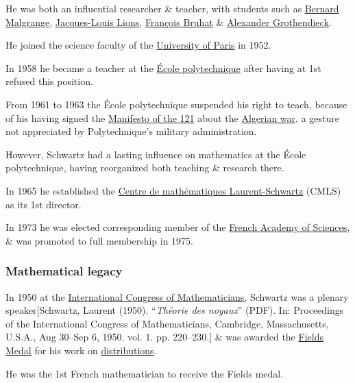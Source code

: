 \documentclass{article}
\begin{document}
He was both an influential researcher \& teacher, with students such as \href{https://en.wikipedia.org/wiki/Bernard_Malgrange}{Bernard Malgrange}, \href{https://en.wikipedia.org/wiki/Jacques-Louis_Lions}{Jacques-Louis Lions}, \href{https://en.wikipedia.org/wiki/Fran%C3%A7ois_Bruhat}{François Bruhat} \& \href{https://en.wikipedia.org/wiki/Alexander_Grothendieck}{Alexander Grothendieck}.

He joined the science faculty of the \href{https://en.wikipedia.org/wiki/University_of_Paris}{University of Paris} in 1952.

In 1958 he became a teacher at the \href{https://en.wikipedia.org/wiki/%C3%89cole_polytechnique}{École polytechnique} after having at 1st refused this position.

From 1961 to 1963 the École polytechnique suspended his right to teach, because of his having signed the \href{https://en.wikipedia.org/wiki/Manifesto_of_the_121}{Manifesto of the 121} about the \href{https://en.wikipedia.org/wiki/Algerian_war}{Algerian war}, a gesture not appreciated by Polytechnique's military administration.

However, Schwartz had a lasting influence on mathematics at the École polytechnique, having reorganized both teaching \& research there.

In 1965 he established the \href{https://en.wikipedia.org/wiki/Centre_de_math%C3%A9matiques_Laurent-Schwartz}{Centre de mathématiques Laurent-Schwartz} (CMLS) as its 1st director.

%
In 1973 he was elected corresponding member of the \href{https://en.wikipedia.org/wiki/French_Academy_of_Sciences}{French Academy of Sciences}, \& was promoted to full membership in 1975.

\subsubsection{Mathematical legacy}
In 1950 at the \href{https://en.wikipedia.org/wiki/International_Congress_of_Mathematicians}{International Congress of Mathematicians}, Schwartz was a plenary speaker[Schwartz, Laurent (1950). ``\textit{Théorie des noyaux}'' (PDF). In: Proceedings of the International Congress of Mathematicians, Cambridge, Massachusetts, U.S.A., Aug 30--Sep 6, 1950. vol. 1. pp. 220--230.] \& was awarded the \href{https://en.wikipedia.org/wiki/Fields_Medal}{Fields Medal} for his work on \href{https://en.wikipedia.org/wiki/Distribution_(mathematics)}{distributions}.

He was the 1st French mathematician to receive the Fields medal.
\end{document}
